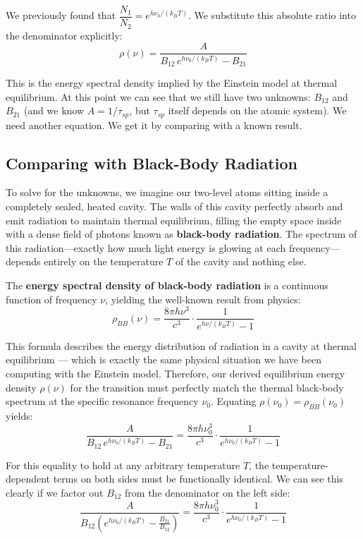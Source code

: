 We previously found that $\dfrac{N_1}{N_2} = e^{h\nu_0/(k_BT)}$. We substitute this absolute ratio into the denominator explicitly:
\begin{equation*}
    \rho(\nu) = \frac{A}{B_{12}\,e^{h\nu_0/(k_BT)} - B_{21}}
\end{equation*}

This is the energy spectral density implied by the Einstein model at thermal equilibrium. At this point we can see that we still have two unknowns: $B_{12}$ and $B_{21}$ (and we know $A = 1/\tau_{sp}$, but $\tau_{sp}$ itself depends on the atomic system). We need another equation. We get it by comparing with a known result.

\subsection{Comparing with Black-Body Radiation}

To solve for the unknowns, we imagine our two-level atoms sitting inside a completely sealed, heated cavity. The walls of this cavity perfectly absorb and emit radiation to maintain thermal equilibrium, filling the empty space inside with a dense field of photons known as \textbf{black-body radiation}. The spectrum of this radiation—exactly how much light energy is glowing at each frequency—depends entirely on the temperature $T$ of the cavity and nothing else.

The \textbf{energy spectral density of black-body radiation} is a continuous function of frequency $\nu$, yielding the well-known result from physics:
\begin{equation*}
    \rho_{BB}(\nu) = \frac{8\pi h\nu^3}{c^3} \cdot \frac{1}{e^{h\nu/(k_BT)} - 1}
\end{equation*}

This formula describes the energy distribution of radiation in a cavity at thermal equilibrium — which is exactly the same physical situation we have been computing with the Einstein model. Therefore, our derived equilibrium energy density $\rho(\nu)$ for the transition must perfectly match the thermal black-body spectrum at the specific resonance frequency $\nu_0$. Equating $\rho(\nu_0) =  \rho_{BB}(\nu_0)$ yields:
\begin{equation*}
    \frac{A}{B_{12}\,e^{h\nu_0/(k_BT)} - B_{21}} = \frac{8\pi h\nu_0^3}{c^3} \cdot \frac{1}{e^{h\nu_0/(k_BT)} - 1}
\end{equation*}

For this equality to hold at any arbitrary temperature $T$, the temperature-dependent terms on both sides must be functionally identical. We can see this clearly if we factor out $B_{12}$ from the denominator on the left side:
\begin{equation*}
    \frac{A}{B_{12}\left(e^{h\nu_0/(k_BT)} - \frac{B_{21}}{B_{12}}\right)} = \frac{8\pi h\nu_0^3}{c^3} \cdot \frac{1}{e^{h\nu_0/(k_BT)} - 1}
\end{equation*}

